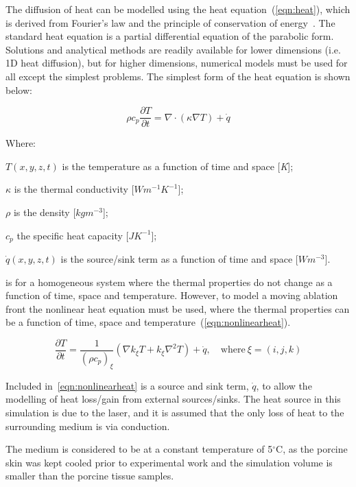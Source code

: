 The diffusion of heat can be modelled using the heat equation~(\cref{eqn:heat}), which is derived from Fourier's law and the principle of conservation of energy~\cite{widder1976heat}.  The standard heat equation is a partial differential equation of the parabolic form. Solutions and analytical methods are readily available for lower dimensions (i.e. 1D heat diffusion), but for higher dimensions, numerical models must be used for all except the simplest problems. The simplest form of the heat equation is shown below:

\begin{equation}
\rho c_p \frac{\partial T}{\partial t}= \nabla \cdot (\kappa \nabla T) + \dot{q}
\label{eqn:heat}
\end{equation}

\noindent Where:

	\indent $T(x, y, z, t)$ is the temperature as a function of time and space [\textit{K}];
	
	\indent $\kappa$ is the thermal conductivity [$W m^{-1} K^{-1}$];
	
	\indent $\rho$ is the density [$kg  m^{-3}$];
	
	\indent $c_p$ the specific heat capacity [$J K^{-1}$];
	
	\indent $\dot{q}(x,y,z,t)$ is the source/sink term as a function of time and space [$W m^{-3}$].
	
	\medskip

 is for a homogeneous system where the thermal properties do not change as a function of time, space and temperature. However, to model a moving ablation front the nonlinear heat equation must be used, where the thermal properties can be a function of time, space and temperature~(\cref{eqn:nonlinearheat}).

\begin{equation}
\frac{\partial T}{\partial t} = \frac{1}{(\rho c_p)_{\xi}}(\nabla k_\xi T + k_\xi\nabla^2T)+\dot{q},\quad \text{where}\ \xi=(i,j,k)
\label{eqn:nonlinearheat}
\end{equation}

Included in~\cref{eqn:nonlinearheat} is a source and sink term, $\dot{q}$, to allow the modelling of heat loss/gain from external sources/sinks. The heat source in this simulation is due to the laser, and it is assumed that the only loss of heat to the surrounding medium is via conduction.
	
The medium is considered to be at a constant temperature of 5$^{\circ}$C, as the porcine skin was kept cooled prior to experimental work and the simulation volume is smaller than the porcine tissue samples. 


